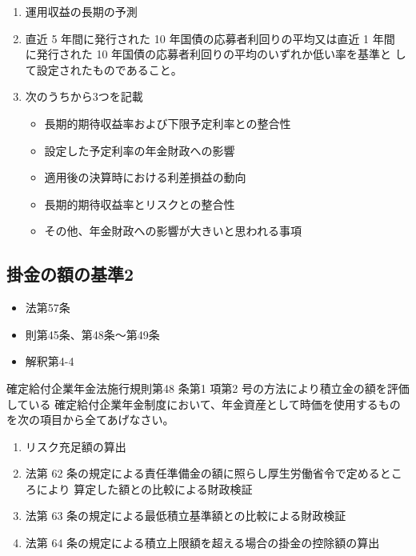 \begin{answerbox}
  \begin{enumerate}[(1)]
  \item 運用収益の長期の予測\\
  \item 直近 5 年間に発行された 10 年国債の応募者利回りの平均又は直近 1 年間 に発行された 10 年国債の応募者利回りの平均のいずれか低い率を基準と して設定されたものであること。\\
  \item 次のうちから3つを記載
  \begin{itemize}
    \item 長期的期待収益率および下限予定利率との整合性
    \item 設定した予定利率の年金財政への影響
    \item 適用後の決算時における利差損益の動向
    \item 長期的期待収益率とリスクとの整合性
    \item その他、年金財政への影響が大きいと思われる事項
  \end{itemize}
\end{enumerate}

\end{answerbox}

\newpage

\subsection{掛金の額の基準2}


\begin{InyouJobunbox}
  \begin{itemize}
    \item 法第57条
    \item 則第45条、第48条〜第49条
    \item 解釈第4-4
  \end{itemize}
\end{InyouJobunbox}


\begin{truefalse}[年金2 2019 問題1(1)\textcircled{3}]
  確定給付企業年金法施行規則第48 条第1 項第2 号の方法により積立金の額を評価している
確定給付企業年金制度において、年金資産として時価を使用するものを次の項目から全てあげなさい。

\begin{enumerate}[1. ]
  \item リスク充足額の算出
  \item 法第 62 条の規定による責任準備金の額に照らし厚生労働省令で定めるところにより
算定した額との比較による財政検証
  \item 法第 63 条の規定による最低積立基準額との比較による財政検証
  \item 法第 64 条の規定による積立上限額を超える場合の掛金の控除額の算出
\end{enumerate}
\end{truefalse}

